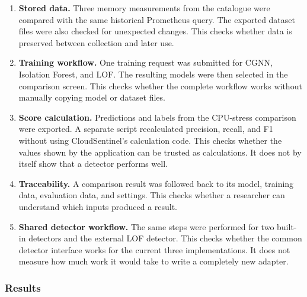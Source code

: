 \begin{enumerate}
    \item[\textbf{F1}] \textbf{Stored data.} Three memory measurements from the
    catalogue were compared with the same historical Prometheus query. The
    exported dataset files were also checked for unexpected changes. This
    checks whether data is preserved between collection and later use.

    \item[\textbf{F2}] \textbf{Training workflow.} One training request was
    submitted for CGNN, Isolation Forest, and LOF. The resulting models were
    then selected in the comparison screen. This checks whether the complete
    workflow works without manually copying model or dataset files.

    \item[\textbf{F3}] \textbf{Score calculation.} Predictions and labels from
    the CPU-stress comparison were exported. A separate script recalculated
    precision, recall, and F1 without using CloudSentinel's calculation code.
    This checks whether the values shown by the application can be trusted as
    calculations. It does not by itself show that a detector performs well.

    \item[\textbf{F4}] \textbf{Traceability.} A comparison result was followed
    back to its model, training data, evaluation data, and settings. This
    checks whether a researcher can understand which inputs produced a result.

    \item[\textbf{F5}] \textbf{Shared detector workflow.} The same steps were
    performed for two built-in detectors and the external LOF detector. This
    checks whether the common detector interface works for the current three
    implementations. It does not measure how much work it would take to write
    a completely new adapter.
\end{enumerate}

\subsubsection{Results}

